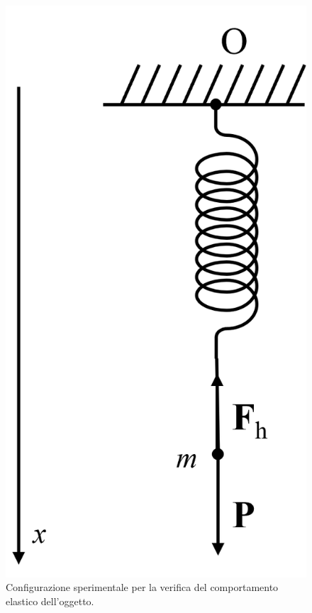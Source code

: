 \begin{figure}[h]
        \centering
        \includegraphics[scale = 0.5]{figures/sch1.png}
        \caption{Configurazione sperimentale per la verifica del comportamento elastico dell'oggetto.}
        \label{fig:figuraVerifica}
\end{figure}
\newpage
{}
